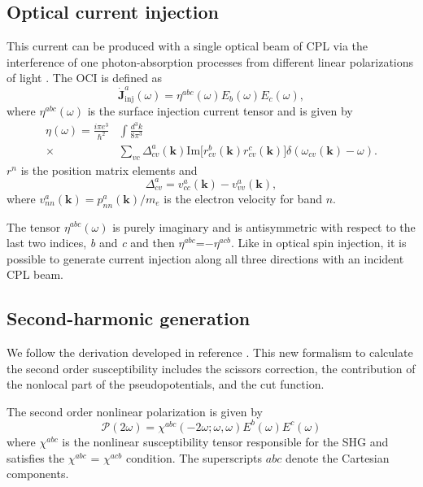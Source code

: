 \documentclass[pss]{wiley2sp} %
\begin{document}
\subsection{Optical current injection}\label{sec:theory-OCI}

This current can be produced with a single optical beam of CPL via the interference of one photon-absorption processes from different linear polarizations of light \cite{sipePRB00}. The  OCI is defined as
\begin{equation}
\mathbf{\dot{J}}^{a}_{\text{inj}}(\omega) =
\eta^{abc}(\omega)E_{b}(\omega)E_{c}(\omega), \label{eq:eta}
\end{equation}
where $\eta^{abc}(\omega)$ is the surface injection current tensor and is given by
\begin{align*}
\eta(\omega) =  \frac{i\pi e^{3}}{\hbar^{2}}&\int\frac{d^{3}k}{8\pi^{3}}
\nonumber \\
\times &
\sum_{vc}\Delta^{a}_{cv}(\mathbf{k})\text{Im}\big[r^{b}_{cv}(\mathbf{k})
r^{c}_{cv}(\mathbf{k})\big]\delta(\omega_{cv}(\mathbf{k})-\omega).
\end{align*}
$r^{n}$ is the position matrix elements and 
\begin{equation*}
\Delta^{a}_{cv} = v^{a}_{cc}(\mathbf{k})-v^{a}_{vv}(\mathbf{k}),
\end{equation*}
where $v^{a}_{nn}(\mathbf{k})=p^{a}_{nn}(\mathbf{k})/m_{e}$ is the electron velocity for band $n$.

The tensor $\eta^{abc}(\omega)$ is purely imaginary and is antisymmetric with respect to the last two indices, \emph{b} and \emph{c} \cite{sipePRB00,nastosPRB06} and then $\eta^{abc}$=$-\eta^{acb}$. Like in optical spin injection, it is possible to generate current injection along all three directions with an incident CPL beam.


\subsection{Second-harmonic generation}\label{sec:theory-SHG}

We follow the derivation developed in reference \cite{andersonPRB15}. This new formalism to calculate the second order susceptibility includes the scissors correction, the contribution of the nonlocal part of the pseudopotentials, and the cut function. 

The second order nonlinear polarization is given by 
\begin{equation*}
\mathcal{P}(2\omega) = \chi^{abc}(-2\omega;\omega,\omega)E^{b}(\omega)E^{c}(\omega)
\end{equation*}
where $\chi^{abc}$ is the nonlinear susceptibility tensor responsible for the SHG and satisfies the $\chi^{abc}$ = $\chi^{acb}$ condition. The superscripts $abc$ denote the Cartesian components.  
\end{document}
